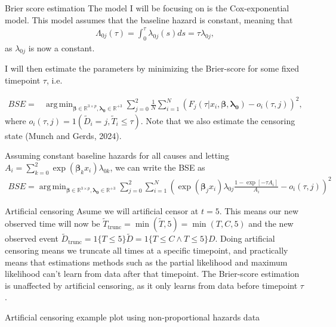 \documentclass{beamer}\usepackage{listings}
\DeclareMathOperator*{\argmin}{arg\,min}
\begin{document}
\begin{frame}[label={sec:orgb978128}]{Brier score estimation}
The model I will be focusing on is the Cox-exponential model. This model assumes that the baseline hazard is constant, meaning that
\begin{align*}
\Lambda_{0j}(\tau) = \int_0^{\tau} \lambda_{0j}(s)ds = \tau\lambda_{0j},
\end{align*}
as \(\lambda_{0j}\) is now a constant. \pause

I will then estimate the parameters by minimizing the Brier-score for some fixed timepoint \(\tau\), i.e.

\begin{align*}
BSE = &\argmin_{\boldsymbol{\beta}\in\mathbb{R}^{3\times p},\boldsymbol{\lambda_0}\in\mathbb{R}^{+3}}\sum_{j = 0}^2\frac{1}{N}\sum_{i = 1}^N(F_j(\tau|x_i,\boldsymbol{\beta},\boldsymbol{\lambda_0})-o_i(\tau,j))^2,
\end{align*}
where \(o_i(\tau,j) = 1(\tilde{D}_i= j,\tilde{T}_i\leq \tau)\). Note that we also estimate the censoring state (Munch and Gerds, 2024). \pause

Assuming constant baseline hazards for all causes and letting \(A_i = \sum_{k = 0}^2 \exp(\boldsymbol{\beta}_kx_i)\lambda_{0k}\), we can write the BSE as
\begin{align*}
BSE = \argmin_{\boldsymbol{\beta}\in\mathbb{R}^{3\times p},\boldsymbol{\lambda_0}\in\mathbb{R}^{+3}}\sum_{j = 0}^2\sum_{i = 1}^N \left(\exp(\boldsymbol{\beta}_jx_i)\lambda_{0j}\frac{1-\exp\left[-\tau A_i\right]}{A_i}-o_i(\tau,j)\right)^2
\end{align*}
\end{frame}




\begin{frame}[label={sec:org4cf67c7}]{Artificial censoring}
Asume we will artificial censor at \(t = 5\). This means our new observed time will now be \(\tilde{T}_{\text{trunc}} = \min(\tilde{T},5) = \min(T,C,5)\) and the new observed event \(\tilde{D}_{\text{trunc}} = 1\{T\leq 5\}\tilde{D} =  1\{T\leq C \wedge T\leq 5\}D\). Doing artificial censoring means we truncate all times at a specific timepoint, and practically means that estimations methods such as the partial likelihood and maximum likelihood can't learn from data after that timepoint. The Brier-score estimation is unaffected by artificial censoring, as it only learns from data before timepoint \(\tau\).
\end{frame}

\begin{frame}[label={sec:org75a1911}]{Artificial censoring example plot using non-proportional hazards data}
\end{frame}
\end{document}
